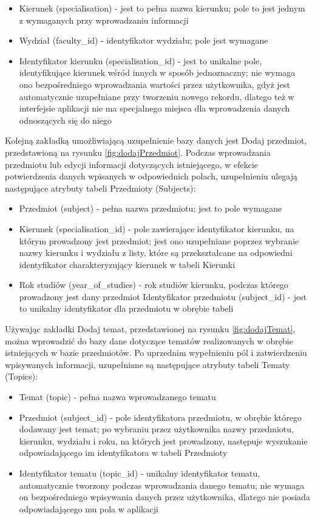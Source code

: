 \begin{itemize}

\item Kierunek (specialisation) - jest to pełna nazwa kierunku; pole to jest jednym z wymaganych przy wprowadzaniu informacji 
\item Wydział (faculty\_id) - identyfikator wydziału; pole jest wymagane
\item Identyfikator kierunku (specialisation\_id) - jest to unikalne pole, identyfikujące kierunek wśród innych w sposób jednoznaczny; nie wymaga ono bezpośredniego wprowadzania wartości przez użytkownika, gdyż jest automatycznie uzupełniane przy tworzeniu nowego rekordu, dlatego też w interfejsie aplikacji nie ma specjalnego miejsca dla wprowadzenia danych odnoszących się do niego
\end{itemize}
Kolejną zakładką umożliwiającą uzupełnienie bazy danych jest Dodaj przedmiot, przedstawioną na rysunku \ref{fig:dodajPrzedmiot}. Podczas wprowadzania przedmiotu lub edycji informacji dotyczących istniejącego, w efekcie potwierdzenia danych wpisanych w odpowiednich polach, uzupełnieniu ulegają następujące atrybuty tabeli Przedmioty (Subjects):
\begin{itemize}
\item Przedmiot (subject) - pełna nazwa przedmiotu; jest to pole wymagane
\item Kierunek (specialisation\_id) - pole zawierające identyfikator kierunku, na którym prowadzony jest przedmiot; jest ono uzupełniane poprzez wybranie nazwy kierunku i wydziału z listy, które są przekształcane na odpowiedni identyfikator charakteryzujący kierunek w tabeli Kierunki
\item Rok studiów (year\_of\_studies) - rok studiów kierunku, podczas którego prowadzony jest dany przedmiot
Identyfikator przedmiotu (subject\_id) - jest to unikalny identyfikator dla przedmiotu w obrębie tabeli
\end{itemize}

Używając zakładki Dodaj temat, przedstawionej na rysunku \ref{fig:dodajTemat}, można wprowadzić do bazy dane dotyczące tematów realizowanych w obrębie istniejących w bazie przedmiotów. Po uprzednim wypełnieniu pól i zatwierdzeniu wpisywanych informacji, uzupełniane są następujące atrybuty tabeli Tematy (Topics):
\begin{itemize}
\item Temat (topic) - pełna nazwa wprowadzanego tematu
\item Przedmiot (subject\_id) - pole identyfikatora przedmiotu, w obrębie którego dodawany jest temat; po wybraniu przez użytkownika nazwy przedmiotu, kierunku, wydziału i roku, na których jest prowadzony, następuje wyszukanie odpowiadającego im identyfikatora w tabeli Przedmioty
\item Identyfikator tematu (topic\_id) - unikalny identyfikator tematu, automatycznie tworzony podczas wprowadzania danego tematu; nie wymaga on bezpośredniego wpisywania danych przez użytkownika, dlatego nie posiada odpowiadającego mu pola w aplikacji
\end{itemize}

